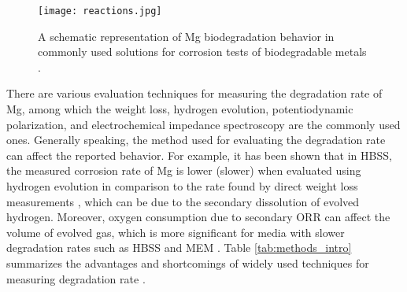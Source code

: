 \begin{figure}
\centering
\medskip
\texttt{[image: reactions.jpg]}
\caption[Mg biodegradation behavior in commonly used test solutions]{A schematic representation of Mg biodegradation behavior in commonly used solutions for corrosion tests of biodegradable metals \cite{Mei2020}.} \label{fig:reactions_intro}
\end{figure}


There are various evaluation techniques for measuring the degradation rate of Mg, among which the weight loss, hydrogen evolution, potentiodynamic polarization, and electrochemical impedance spectroscopy are the commonly used ones. Generally speaking, the method used for evaluating the degradation rate can affect the reported behavior. For example, it has been shown that in \gls{HBSS}, the measured corrosion rate of Mg is lower (slower) when evaluated using hydrogen evolution in comparison to the rate found by direct weight loss measurements \cite{Johnston2015,Johnston2019}, which can be due to the secondary dissolution of evolved hydrogen. Moreover, oxygen consumption due to secondary \gls{ORR} can affect the volume of evolved gas, which is more significant for media with slower degradation rates such as \gls{HBSS} and \gls{MEM} \cite{Wang2020}. Table \ref{tab:methods_intro} summarizes the advantages and shortcomings of widely used techniques for measuring degradation rate \cite{Mei2020}. 


